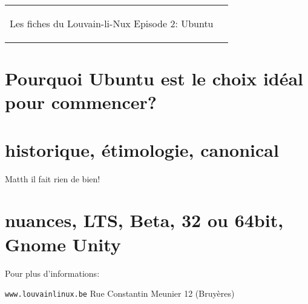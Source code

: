 



\begin{tabular}{p{13cm}r}
    \begin{center}{\Large Les fiches du Louvain-li-Nux\linebreak \linebreak
	\LARGE Episode 2: Ubuntu}\end{center}
		&
	\usebox{\logollnux}
\end{tabular}


\section*{Pourquoi Ubuntu est le choix idéal pour commencer?}



\section*{historique, étimologie, canonical}
Matth il fait rien de bien!



\section*{nuances, LTS, Beta, 32 ou 64bit, Gnome Unity}



Pour plus d'informations:

\begin{center}\texttt{www.louvainlinux.be} \hspace{0.5cm}Rue Constantin Meunier 12 (Bruyères)\end{center}
                                                                                                                       
		